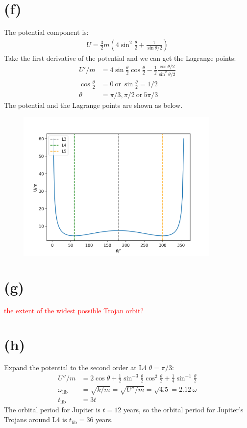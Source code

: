 \documentclass[a4paper,12pt]{article}
\begin{document}
\section*{(f)}
The potential component is:
\begin{align*}
    U = \frac{3}{2}m (4\sin ^2 \frac{\theta}{2} +\frac{1}{\sin \theta/2})
\end{align*}
Take the first derivative of the potential and we can get the Lagrange points:
\begin{align*}
    U'/m &= 4\sin \frac{\theta}{2} \cos \frac{\theta}{2} - \frac{1}{2} \frac{\cos \theta/2}{\sin^2 \theta/2} \\
    \cos \frac{\theta}{2} &= 0 \ \text{or} \ \sin \frac{\theta}{2} = 1/2 \\
    \theta &= \pi/3, \pi/2 \ \text{or} \ 5\pi/3
\end{align*}
The potential and the Lagrange points are shown as below.
\begin{figure}[htbp]
    \centering
    \includegraphics*[width=10cm]{Ls.png}
\end{figure}

\section*{(g)}
\textcolor{red}{ the extent of the widest possible Trojan orbit? }

\section*{(h)}
Expand the potential to the second order at L4 $\theta=\pi/3$:
\begin{align*}
    U''/m &= 2\cos \theta + \frac{1}{2} \sin^{-3} \frac{\theta}{2} \cos ^2 \frac{\theta}{2} + \frac{1}{4} \sin ^{-1} \frac{\theta}{2} \\
    \omega_{\text{lib}} &= \sqrt{k/m} = \sqrt{U''/m} = \sqrt{4.5} = 2.12 \ \omega \\
    t_{\text{lib}} &= 3 t
\end{align*}
The orbital period for Jupiter is $t=12$ years, so the orbital period for Jupiter's Trojans around L4 is $t_{\text{lib}}=36$ years.
\end{document}
